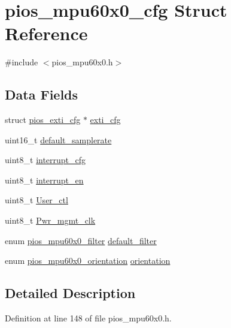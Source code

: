 \hypertarget{structpios__mpu60x0__cfg}{\section{pios\-\_\-mpu60x0\-\_\-cfg \-Struct \-Reference}
\label{structpios__mpu60x0__cfg}
}


{\ttfamily \#include $<$pios\-\_\-mpu60x0.\-h$>$}

\subsection*{\-Data \-Fields}
\begin{DoxyCompactItemize}
\item 
struct \hyperlink{structpios__exti__cfg}{pios\-\_\-exti\-\_\-cfg} $\ast$ \hyperlink{structpios__mpu60x0__cfg_a3060efb7fe61ef6816d0c76c464bd3f9}{exti\-\_\-cfg}
\item 
uint16\-\_\-t \hyperlink{structpios__mpu60x0__cfg_af4581a0013e107281a5ebefa0745d6ff}{default\-\_\-samplerate}
\item 
uint8\-\_\-t \hyperlink{structpios__mpu60x0__cfg_aeadd184c43fe44f818bba2b94d80e099}{interrupt\-\_\-cfg}
\item 
uint8\-\_\-t \hyperlink{structpios__mpu60x0__cfg_a34f330d80ad1406663dbe14f1ae362cd}{interrupt\-\_\-en}
\item 
uint8\-\_\-t \hyperlink{structpios__mpu60x0__cfg_a2fd36500bdaf115a26e2ce8937441a17}{\-User\-\_\-ctl}
\item 
uint8\-\_\-t \hyperlink{structpios__mpu60x0__cfg_ad4ef97a93c0b2cfc7e71652b2ec8c546}{\-Pwr\-\_\-mgmt\-\_\-clk}
\item 
enum \hyperlink{group___p_i_o_s___m_p_u60_x0_gacce1988bc994f5ade6ac748c2bf0b924}{pios\-\_\-mpu60x0\-\_\-filter} \hyperlink{structpios__mpu60x0__cfg_a50a6612b9fff2bd96908996d7d734ef3}{default\-\_\-filter}
\item 
enum \hyperlink{group___p_i_o_s___m_p_u60_x0_ga0b97f6902b1564a6eedf92c8937a2a67}{pios\-\_\-mpu60x0\-\_\-orientation} \hyperlink{structpios__mpu60x0__cfg_a43ab1b1e72abc2f1fcf722afefa92dc1}{orientation}
\end{DoxyCompactItemize}


\subsection{\-Detailed \-Description}


\-Definition at line 148 of file pios\-\_\-mpu60x0.\-h.



